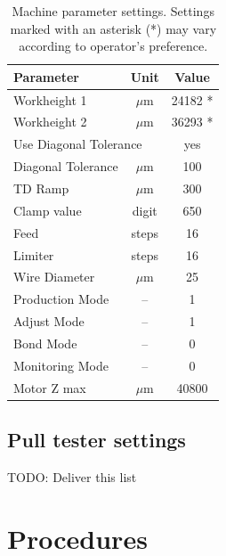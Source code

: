 \documentclass[10pt]{unlsilabsop}
\begin{document}
\begin{table}[hH]
\begin{center}
\caption{Machine parameter settings. Settings marked with an asterisk (*) may vary according to operator's preference.}
\label{tbl:otherpar}

\bigskip

\begin{tabular}{lcc}
\toprule
Parameter          & Unit   & Value \\
\midrule
Workheight 1       & $\mu$m & 24182 *\\
Workheight 2       & $\mu$m & 36293 * \\
\multicolumn{2}{l}{Use Diagonal Tolerance} & yes \\
Diagonal Tolerance & $\mu$m & 100 \\
TD Ramp            & $\mu$m & 300 \\
Clamp value        & digit  & 650 \\
Feed               & steps  & 16 \\
Limiter            & steps  & 16 \\
Wire Diameter      & $\mu$m & 25 \\
Production Mode    & --     & 1 \\
Adjust Mode        & --     & 1 \\
Bond Mode          & --     & 0 \\
Monitoring Mode    & --     & 0 \\
\midrule
Motor Z max        & $\mu$m & 40800 \\
    \bottomrule
\end{tabular}
\end{center}
\end{table}

\subsection{Pull tester settings}
TODO: Deliver this list


\section{Procedures}
\end{document}
